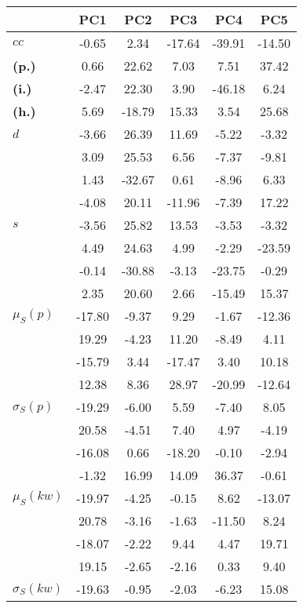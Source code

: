 \begin{table}[h!]
\begin{center}
\begin{tabular}{| l || c | c | c | c | c |}\hline
 & {\bf PC1} & {\bf PC2} & {\bf PC3} & {\bf PC4} & {\bf PC5} \\\hline\hline
{\bf $cc$} & -0.65 & 2.34 & -17.64 & -39.91 & -14.50 \\
{\bf (p.)} & 0.66 & 22.62 & 7.03 & 7.51 & 37.42 \\
{\bf (i.)} & -2.47 & 22.30 & 3.90 & -46.18 & 6.24 \\
{\bf (h.)} & 5.69 & -18.79 & 15.33 & 3.54 & 25.68 \\\hline
{\bf $d$} & -3.66 & 26.39 & 11.69 & -5.22 & -3.32 \\
{\bf } & 3.09 & 25.53 & 6.56 & -7.37 & -9.81 \\
{\bf } & 1.43 & -32.67 & 0.61 & -8.96 & 6.33 \\
{\bf } & -4.08 & 20.11 & -11.96 & -7.39 & 17.22 \\\hline
{\bf $s$} & -3.56 & 25.82 & 13.53 & -3.53 & -3.32 \\
{\bf } & 4.49 & 24.63 & 4.99 & -2.29 & -23.59 \\
 & -0.14  & -30.88  & -3.13  & -23.75  & -0.29 \\
 & 2.35  & 20.60  & 2.66  & -15.49  & 15.37 \\\hline
$\mu_S(p)$ & -17.80  & -9.37  & 9.29  & -1.67  & -12.36 \\
 & 19.29  & -4.23  & 11.20  & -8.49  & 4.11 \\
 & -15.79  & 3.44  & -17.47  & 3.40  & 10.18 \\
 & 12.38  & 8.36  & 28.97  & -20.99  & -12.64 \\\hline
$\sigma_S(p)$ & -19.29  & -6.00  & 5.59  & -7.40  & 8.05 \\
 & 20.58  & -4.51  & 7.40  & 4.97  & -4.19 \\
 & -16.08  & 0.66  & -18.20  & -0.10  & -2.94 \\
 & -1.32  & 16.99  & 14.09  & 36.37  & -0.61 \\\hline
$\mu_S(kw)$ & -19.97  & -4.25  & -0.15  & 8.62  & -13.07 \\
 & 20.78  & -3.16  & -1.63  & -11.50  & 8.24 \\
 & -18.07  & -2.22  & 9.44  & 4.47  & 19.71 \\
 & 19.15  & -2.65  & -2.16  & 0.33  & 9.40 \\\hline
$\sigma_S(kw)$ & -19.63  & -0.95  & -2.03  & -6.23  & 15.08 \\

\end{tabular}
\end{center}
\end{table}
